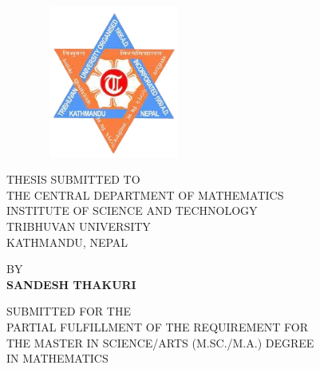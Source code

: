 \begin{center}
  {\LARGE
    {\bfseries {\MakeTextUppercase {\thetitle}}}} \\

  \vspace{1.5cm}

\begin{figure}[h]
	\centering
	\includegraphics[height=5cm,width=5cm]{pictures/tulogo.png}
\end{figure}

\vspace{2cm}

	THESIS SUBMITTED TO\\ THE
	 CENTRAL DEPARTMENT OF MATHEMATICS\\
	INSTITUTE OF SCIENCE AND TECHNOLOGY\\
	TRIBHUVAN UNIVERSITY \\
	KATHMANDU, NEPAL\\

\vspace{1.5cm}

	BY\\
	{\bfseries SANDESH THAKURI}

\vspace{1.5cm}

SUBMITTED FOR THE\\
PARTIAL FULFILLMENT OF THE REQUIREMENT FOR\\
THE MASTER IN SCIENCE/ARTS (M.SC./M.A.)  DEGREE\\
IN MATHEMATICS\\

\vspace{1.5cm}

{\MakeTextUppercase {\thedate}}

\end{center}

\thispagestyle{empty}

\clearpage